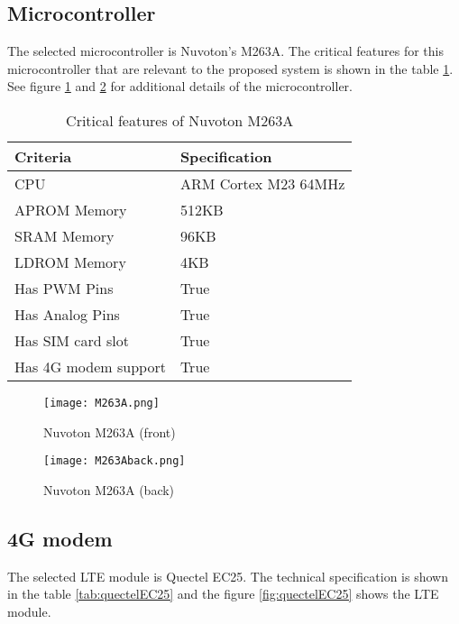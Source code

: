 \documentclass[../thesis.tex]{subfiles}
\begin{document}
\subsection{Microcontroller}

The selected microcontroller is Nuvoton's M263A. The critical features for this microcontroller that are relevant to the proposed system is shown in the table \ref{tab:microcontrollerSpecification}. See figure \ref{fig:m263A} and \ref{fig:m263Aback} for additional details of the microcontroller. 

\begin{table}[h!]
	\begin{center}
		\caption{Critical features of Nuvoton M263A}
		\label{tab:microcontrollerSpecification}
		\begin{tabular}{l|l}
			\toprule
			\textbf{Criteria} & \textbf{Specification}\\
			\midrule
			CPU & ARM Cortex M23 64MHz\\
			APROM Memory & 512KB\\
			SRAM Memory & 96KB\\
			LDROM Memory & 4KB\\
			Has PWM Pins & True\\
			Has Analog Pins & True\\
			Has SIM card slot & True\\
			Has 4G modem support & True\\
			\bottomrule
		\end{tabular}
	\end{center}
\end{table}

\begin{figure}[!ht]
	\texttt{[image: M263A.png]}
	\caption{Nuvoton M263A (front) \cite{Nuvoton}}
	\label{fig:m263A}
\end{figure}

\begin{figure}[!ht]
	\texttt{[image: M263Aback.png]}
	\caption{Nuvoton M263A (back) \cite{Nuvoton}}
	\label{fig:m263Aback}
\end{figure}

\subsection{4G modem}

The selected LTE module is Quectel EC25. The technical specification is shown in the table \ref{tab:quectelEC25} and the figure \ref{fig:quectelEC25} shows the LTE module. 
\end{document}

